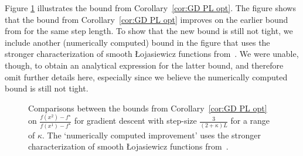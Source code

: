 \documentclass{article} %
\begin{document}
Figure \ref{fig:4} illustrates the bound from Corollary~\ref{cor:GD PL opt}.
The figure shows that the bound from Corollary~\ref{cor:GD PL opt} improves on the earlier bound from \cite[Theorem 3(ii)]{abbaszadehpeivasti2022PL} for the same step length.
To show that the new bound is still not tight, we include another (numerically computed) bound in the figure that uses the stronger characterization of smooth \L{}ojasiewicz functions from~\cite[Proposition 3.4]{rubbens2025constructive}.
We were unable, though, to obtain an analytical expression for the latter bound, and therefore omit further details here, especially since we believe the
numerically computed bound is still not tight.
\begin{figure}[h!]
\centering
{}
\caption{\label{fig:4} Comparisons between the bounds from Corollary~\ref{cor:GD PL opt} on
 $\frac{f(x^2)-f^\star}{f(x^1)-f^\star}$ for gradient descent with step-size $\frac{3}{(2+\kappa ) L}$ for a range of $\kappa$.
 The `numerically computed improvement' uses the stronger characterization of
 smooth \L{}ojasiewicz functions from~\cite[Proposition 3.4]{rubbens2025constructive}.}
\end{figure}
\end{document}
